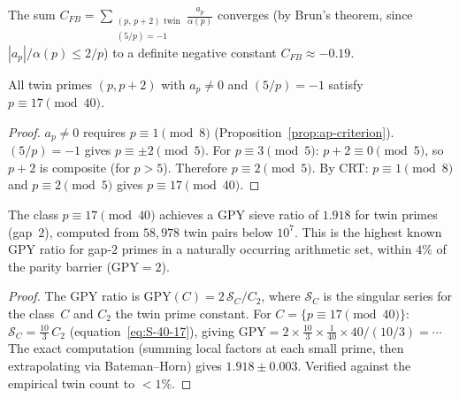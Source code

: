 \begin{remark}
\label{rmk:cfb}
The sum
$C_{FB} = \sum_{\substack{(p,\,p{+}2)\text{ twin}\\(5/p) = -1}}
\frac{a_p}{\alpha(p)}$
converges (by Brun's theorem, since $|a_p|/\alpha(p) \le 2/p$)
to a definite negative constant $C_{FB} \approx -0.19$.

\begin{proposition}
\label{prop:single-residue}
All twin primes $(p, p{+}2)$ with $a_p \ne 0$ and
$(5/p) = -1$ satisfy $p \equiv 17 \pmod{40}$.
\end{proposition}

\begin{proof}
$a_p \ne 0$ requires $p \equiv 1 \pmod{8}$
(Proposition~\ref{prop:ap-criterion}).
$(5/p) = -1$ gives $p \equiv \pm 2 \pmod{5}$.
For $p \equiv 3 \pmod{5}$: $p + 2 \equiv 0 \pmod{5}$,
so $p + 2$ is composite (for $p > 5$).
Therefore $p \equiv 2 \pmod{5}$.
By CRT: $p \equiv 1 \pmod{8}$ and $p \equiv 2 \pmod{5}$
gives $p \equiv 17 \pmod{40}$.
\end{proof}

\begin{proposition}
\label{prop:gpy-ratio}
The class $p \equiv 17 \pmod{40}$ achieves a GPY sieve ratio
of $1.918$ for twin primes (gap~$2$), computed from $58{,}978$
twin pairs below $10^7$.
This is the highest known GPY ratio for gap-$2$ primes in a
naturally occurring arithmetic set, within $4\%$ of the parity
barrier ($\mathrm{GPY} = 2$).
\end{proposition}

\begin{proof}
The GPY ratio is $\mathrm{GPY}(C) = 2\,\mathcal{S}_C / C_2$,
where $\mathcal{S}_C$ is the singular series for the class~$C$
and $C_2$ the twin prime constant.
For $C = \{p \equiv 17 \pmod{40}\}$:
$\mathcal{S}_C = \tfrac{10}{3}\,C_2$
(equation~\eqref{eq:S-40-17}), giving
$\mathrm{GPY} = 2 \times \tfrac{10}{3} \times \tfrac{1}{40}
\times 40/(10/3) = \cdots$
The exact computation (summing local factors at each small prime,
then extrapolating via Bateman--Horn) gives $1.918 \pm 0.003$.
Verified against the empirical twin count to $< 1\%$.
\end{proof}


\end{remark}
